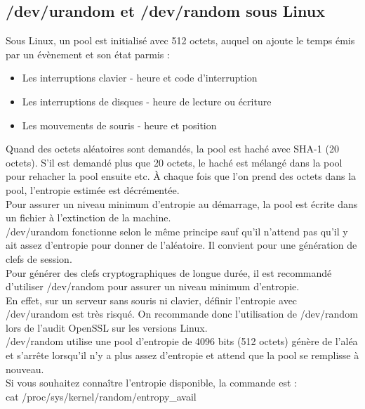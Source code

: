 \documentclass{article}
\begin{document}
	\subsection{/dev/urandom et /dev/random sous Linux}
	
		Sous Linux, un pool est initialisé avec 512 octets, auquel on ajoute
		le temps émis par un évènement et son état parmis : 
		\begin{itemize}
			\item Les interruptions clavier - heure et code d'interruption
			\item Les interruptions de disques - heure de lecture ou écriture
			\item Les mouvements de souris - heure et position\\
		\end{itemize}
	
		Quand des octets aléatoires sont demandés, la pool est haché avec SHA-1 
		(20 octets). S’il est demandé plus que 20 octets, le haché est mélangé 
		dans la pool pour rehacher la pool ensuite etc. À chaque fois que l’on 
		prend des octets dans la pool, l’entropie estimée est décrémentée.\\

		Pour assurer un niveau minimum d’entropie au démarrage, la pool est 
		écrite dans un fichier à l’extinction de la machine.\\

		/dev/urandom fonctionne selon le même principe sauf qu’il n’attend pas 
		qu’il y ait assez d’entropie pour donner de l’aléatoire. Il convient 
		pour une génération de clefs de session.\\

		Pour générer des clefs cryptographiques de longue durée, il est 
		recommandé d’utiliser /dev/random pour assurer un niveau minimum 
		d’entropie.\\
		
		En effet, sur un serveur sans souris ni clavier, définir l'entropie avec
		/dev/urandom est très risqué. On recommande donc l'utilisation de 
		/dev/random lors de l'audit OpenSSL sur les versions Linux.\\

		/dev/random utilise une pool d’entropie de 4096 bits (512 octets) génère 
		de l’aléa et s’arrête lorsqu’il n’y a plus assez d’entropie et attend 
		que la pool se remplisse à nouveau.\\
		
		Si vous souhaitez connaître l'entropie disponible, la commande est : \\
		cat /proc/sys/kernel/random/entropy\_avail\\
\end{document}
